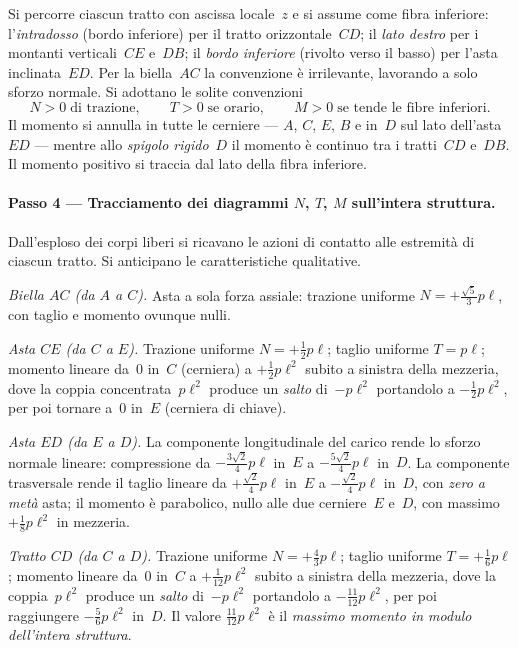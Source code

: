 Si percorre ciascun tratto con ascissa locale~$z$ e si
assume come fibra inferiore: l'\emph{intradosso} (bordo
inferiore) per il tratto orizzontale~$CD$; il \emph{lato
	destro} per i montanti verticali~$CE$ e~$DB$; il \emph{bordo
	inferiore} (rivolto verso il basso) per l'asta inclinata~$ED$.
Per la biella~$AC$ la convenzione è irrilevante, lavorando a
solo sforzo normale. Si adottano le solite convenzioni
\[
N > 0 \;\text{di trazione},
\qquad
T > 0 \;\text{se orario},
\qquad
M > 0 \;\text{se tende le fibre inferiori}.
\]
Il momento si annulla in tutte le cerniere --- $A$, $C$,
$E$, $B$ e in~$D$ sul lato dell'asta~$ED$ --- mentre allo
\emph{spigolo rigido}~$D$ il momento è continuo tra i
tratti~$CD$ e~$DB$. Il momento positivo si traccia dal lato
della fibra inferiore.

\paragraph{Passo 4 --- Tracciamento dei diagrammi
	$N$, $T$, $M$ sull'intera struttura.}

Dall'esploso dei corpi liberi si ricavano le azioni di
contatto alle estremità di ciascun tratto. Si anticipano le
caratteristiche qualitative.

\medskip
\noindent\textit{Biella $AC$ (da $A$ a $C$).}
Asta a sola forza assiale: trazione uniforme
$N = +\tfrac{\sqrt5}{3}p\ell$, con taglio e momento ovunque
nulli.

\medskip
\noindent\textit{Asta $CE$ (da $C$ a $E$).}
Trazione uniforme $N = +\tfrac12 p\ell$; taglio uniforme
$T = p\ell$; momento lineare da~$0$ in~$C$ (cerniera) a
$+\tfrac12 p\ell^2$ subito a sinistra della mezzeria, dove
la coppia concentrata~$p\ell^2$ produce un \emph{salto}
di~$-p\ell^2$ portandolo a $-\tfrac12 p\ell^2$, per poi
tornare a~$0$ in~$E$ (cerniera di chiave).

\medskip
\noindent\textit{Asta $ED$ (da $E$ a $D$).}
La componente longitudinale del carico rende lo sforzo
normale lineare: compressione da $-\tfrac{3\sqrt2}{4}p\ell$
in~$E$ a $-\tfrac{5\sqrt2}{4}p\ell$ in~$D$. La componente
trasversale rende il taglio lineare da $+\tfrac{\sqrt2}{4}p\ell$
in~$E$ a $-\tfrac{\sqrt2}{4}p\ell$ in~$D$, con \emph{zero a
	metà} asta; il momento è parabolico, nullo alle due
cerniere~$E$ e~$D$, con massimo $+\tfrac18 p\ell^2$ in
mezzeria.

\medskip
\noindent\textit{Tratto $CD$ (da $C$ a $D$).}
Trazione uniforme $N = +\tfrac43 p\ell$; taglio uniforme
$T = +\tfrac16 p\ell$; momento lineare da~$0$ in~$C$ a
$+\tfrac{1}{12}p\ell^2$ subito a sinistra della mezzeria,
dove la coppia~$p\ell^2$ produce un \emph{salto} di~$-p\ell^2$
portandolo a $-\tfrac{11}{12}p\ell^2$, per poi raggiungere
$-\tfrac56 p\ell^2$ in~$D$. Il valore $\tfrac{11}{12}p\ell^2$
è il \emph{massimo momento in modulo dell'intera struttura}.

